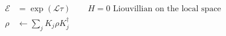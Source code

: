 \documentclass[12pt]{article}
\begin{document}
\fontsize{22}{28}\selectfont
\begin{align*}
\mathcal{E} &= \exp(\mathcal{L}\tau)
      \qquad\text{$H=0$ Liouvillian on the local space} \\[0.55em]
\rho &\leftarrow \sum_j K_j\rho K_j^\dagger
\end{align*}
\end{document}
